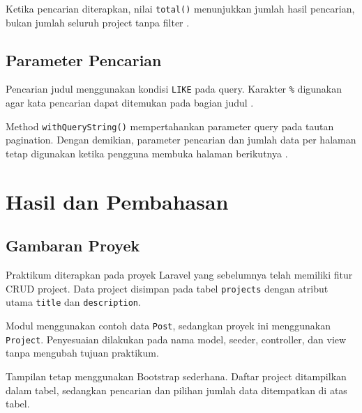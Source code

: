 \documentclass[a4paper,oneside,11pt]{book}
\renewcommand{\_}{\textunderscore\allowbreak{}}
\begin{document}
Ketika pencarian diterapkan, nilai \texttt{total()} menunjukkan jumlah
hasil pencarian, bukan jumlah seluruh project tanpa filter \cite{laravel-pagination}.

\section{Parameter Pencarian}

Pencarian judul menggunakan kondisi \texttt{LIKE} pada query.
Karakter \texttt{\%} digunakan agar kata pencarian dapat ditemukan
pada bagian judul \cite{laravel-queries}.

Method \texttt{withQueryString()} mempertahankan parameter query pada
tautan pagination. Dengan demikian, parameter pencarian dan jumlah
data per halaman tetap digunakan ketika pengguna membuka halaman
berikutnya \cite{laravel-pagination}.

\chapter{Hasil dan Pembahasan}

\section{Gambaran Proyek}

Praktikum diterapkan pada proyek Laravel yang sebelumnya telah memiliki
fitur CRUD project. Data project disimpan pada tabel
\texttt{projects} dengan atribut utama \texttt{title} dan
\texttt{description}.

Modul menggunakan contoh data \texttt{Post}, sedangkan proyek ini
menggunakan \texttt{Project}. Penyesuaian dilakukan pada nama model,
seeder, controller, dan view tanpa mengubah tujuan praktikum.

Tampilan tetap menggunakan Bootstrap sederhana. Daftar project
ditampilkan dalam tabel, sedangkan pencarian dan pilihan jumlah data
ditempatkan di atas tabel.
\end{document}

